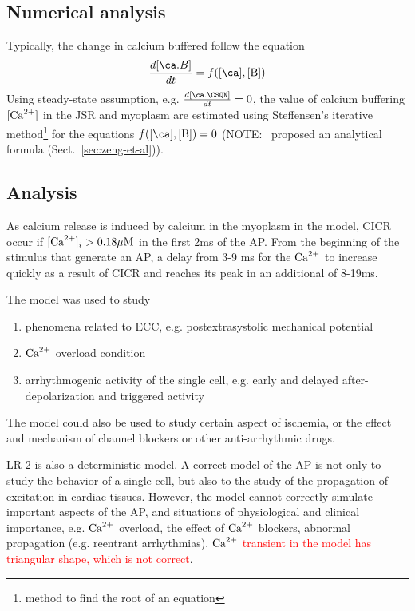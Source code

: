 \subsection{Numerical analysis}
\label{sec:numerical-analysis-2}

Typically, the change in calcium buffered follow the equation
\begin{equation}
  \label{eq:1295}
  \frac{d[\ca.B]}{dt} = f([\ca],[\B])
\end{equation}
Using steady-state assumption, e.g.  $\frac{d[\ca.\CSQN]}{dt} =0$, the
value of calcium buffering $[{\text{Ca}^{2+}}]$ in the JSR and myoplasm are
estimated using Steffensen's iterative
method\footnote{method to find the root of an equation} for the
equations $f([\ca],[\B])=0$ (NOTE:~\citep{zeng1995} proposed an
analytical formula (Sect.~\ref{sec:zeng-et-al})).


\subsection{Analysis}
\label{sec:analysis-11}

As calcium release is induced by calcium in the myoplasm in the model, CICR
occur if $[{\text{Ca}^{2+}}]_i > 0.18 {\mu\text{M}}$ in the first 2ms of the AP. From the beginning of
the stimulus that generate an AP, a delay from 3-9 ms for the ${\text{Ca}^{2+}}$ to increase
quickly as a result of CICR and reaches its peak in an additional of 8-19ms.

The model was used to study~\citep{luo1994dmc_b}
\begin{enumerate}
\item phenomena related to ECC, e.g. postextrasystolic mechanical
  potential
\item ${\text{Ca}^{2+}}$ overload condition
\item arrhythmogenic activity of the single cell, e.g. early and
  delayed after-depolarization and triggered activity
\end{enumerate}
The model could also be used to study certain aspect of ischemia, or
the effect and mechanism of channel blockers or other anti-arrhythmic
drugs.

LR-2 is also a deterministic model.  A correct model of the AP is not
only to study the behavior of a single cell, but also to the study of
the propagation of excitation in cardiac tissues. However, the model
cannot correctly simulate important aspects of the AP, and situations
of physiological and clinical importance, e.g. ${\text{Ca}^{2+}}$ overload,
the effect of ${\text{Ca}^{2+}}$ blockers, abnormal propagation
(e.g. reentrant arrhythmias). \textcolor{red}{${\text{Ca}^{2+}}$ transient in the model has
triangular shape, which is not correct}.


